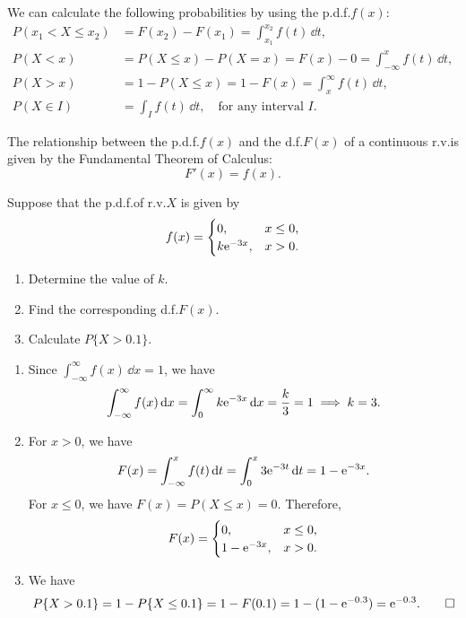 We can calculate the following probabilities by using the p.d.f.\@ \(f(x)\):
\begin{align*}
  P(x_1 < X \leq x_2) & = F(x_2) - F(x_1) = \int_{x_1}^{x_2} f(t)\,\dd t, \\
  P(X < x) & = P(X \leq x) - P(X = x) = F(x) - 0 = \int_{-\infty}^x f(t)\,\dd t, \\
  P(X > x) & = 1 - P(X \leq x) = 1 - F(x) = \int_x^\infty f(t)\,\dd t, \\
  P(X \in I) & = \int_I f(t)\,\dd t, \quad \text{for any interval } I.
\end{align*}

The relationship between the p.d.f.\@ \(f(x)\) and the d.f.\@ \(F(x)\) of a continuous r.v.\@ is given by the Fundamental Theorem of Calculus:
\[
  F'(x) = f(x).
\]

\begin{example}
  Suppose that the p.d.f.\@ of r.v.\@ \(X\) is given by
  \[
    f(x) = \begin{cases}
      0, & x \leq 0, \\
      k \mathrm{e}^{-3x}, & x > 0.
    \end{cases}
  \]
  \begin{enumerate}
    \item Determine the value of \(k\).
    \item Find the corresponding d.f.\@ \(F(x)\).
    \item Calculate \(P\{X > 0.1\}\).
  \end{enumerate}
\end{example}
\begin{solution}
  \begin{enumerate}
    \item Since \(\int_{-\infty}^\infty f(x)\,\dd x = 1\), we have
    \[
      \int_{-\infty}^\infty f(x)\,\mathrm{d} x = \int_0^\infty k \mathrm{e}^{-3x}\,\mathrm{d} x = \frac{k}{3} = 1 \implies k = 3.
    \]
    \item For \(x > 0\), we have
    \[
      F(x) = \int_{-\infty}^x f(t)\,\mathrm{d} t = \int_0^x 3 \mathrm{e}^{-3t}\,\mathrm{d} t = 1 - \mathrm{e}^{-3x}.
    \]
    For \(x \leq 0\), we have \(F(x) = P(X \leq x) =  0\). Therefore,
    \[
      F(x) = \begin{cases}
        0, & x \leq 0, \\
        1 - \mathrm{e}^{-3x}, & x > 0.
      \end{cases}
    \]
    \item We have
    \[
      P\{X > 0.1\} = 1 - P\{X \leq 0.1\} = 1 - F(0.1) = 1 - (1 - \mathrm{e}^{-0.3}) = \mathrm{e}^{-0.3}. \qedhere
    \]
  \end{enumerate}
\end{solution}

